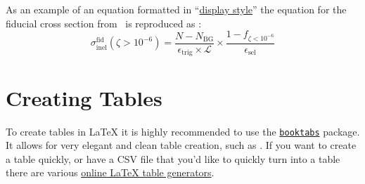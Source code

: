 As an example of an equation formatted in ``\href{https://www.overleaf.com/learn/latex/Display_style_in_math_mode}{display style}'' the equation for the fiducial cross section from~\cite{STDM-2015-05} is reproduced as :
\begin{equation}
 \sigma_{\mathrm{inel}}^{\mathrm{fid}} \left(\zeta > 10^{-6}\right) = \frac{N - N_{\mathrm{BG}}}{\epsilon_{\mathrm{trig}} \times \mathcal{L}} \times \frac{1 - f_{\zeta < 10^{-6}}}{\epsilon_{\mathrm{sel}}}
 \label{eq:fiducial_cross_section}
\end{equation}

\section{Creating Tables}\label{sec:tables}

To create tables in \LaTeX{} it is highly recommended to use the \href{https://www.ctan.org/pkg/booktabs}{\texttt{booktabs}} package.
It allows for very elegant and clean table creation, such as .
If you want to create a table quickly, or have a CSV file that you'd like to quickly turn into a table there are various \href{https://www.tablesgenerator.com/}{online \LaTeX{} table generators}.

